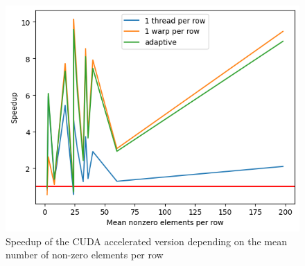 \documentclass{article}
\begin{document}
\begin{figure}[H]
\centering
\includegraphics[]{images/speedup_nnz.png}
\caption{Speedup of the CUDA accelerated version depending on the mean number of non-zero elements per row}
\label{img:speedup_nnz}
\end{figure}

 

\end{document}
